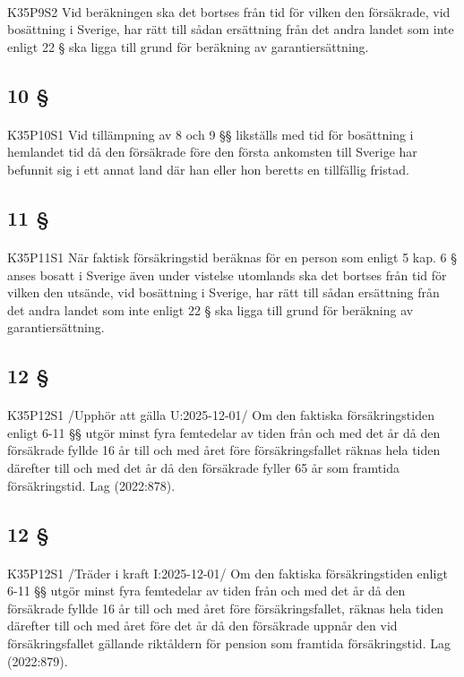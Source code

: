 \documentclass[a4paper,notitlepage,openany,10pt]{book}
\begin{document}
\paragraph*{}
{\tiny K35P9S2}
Vid beräkningen ska det bortses från tid för vilken den försäkrade, vid bosättning i Sverige, har rätt till sådan ersättning från det andra landet som inte enligt 22 § ska ligga till grund för beräkning av garantiersättning.
\subsection*{10 §}
\paragraph*{}
{\tiny K35P10S1}
Vid tillämpning av 8 och 9 §§ likställs med tid för bosättning i hemlandet tid då den försäkrade före den första ankomsten till Sverige har befunnit sig i ett annat land där han eller hon beretts en tillfällig fristad.
\subsection*{11 §}
\paragraph*{}
{\tiny K35P11S1}
När faktisk försäkringstid beräknas för en person som enligt 5 kap. 6 § anses bosatt i Sverige även under vistelse utomlands ska det bortses från tid för vilken den utsände, vid bosättning i Sverige, har rätt till sådan ersättning från det andra landet som inte enligt 22 § ska ligga till grund för beräkning av garantiersättning.
\subsection*{12 §}
\paragraph*{}
{\tiny K35P12S1}
/Upphör att gälla U:2025-12-01/
Om den faktiska försäkringstiden enligt 6-11 §§ utgör minst fyra femtedelar av tiden från och med det år då den försäkrade fyllde 16 år till och med året före försäkringsfallet räknas hela tiden därefter till och med det år då den försäkrade fyller 65 år som framtida försäkringstid.
Lag (2022:878).
\subsection*{12 §}
\paragraph*{}
{\tiny K35P12S1}
/Träder i kraft I:2025-12-01/
Om den faktiska försäkringstiden enligt 6-11 §§ utgör minst fyra femtedelar av tiden från och med det år då den försäkrade fyllde 16 år till och med året före försäkringsfallet, räknas hela tiden därefter till och med året före det år då den försäkrade uppnår den vid försäkringsfallet gällande riktåldern för pension som framtida försäkringstid.
Lag (2022:879).
\end{document}
